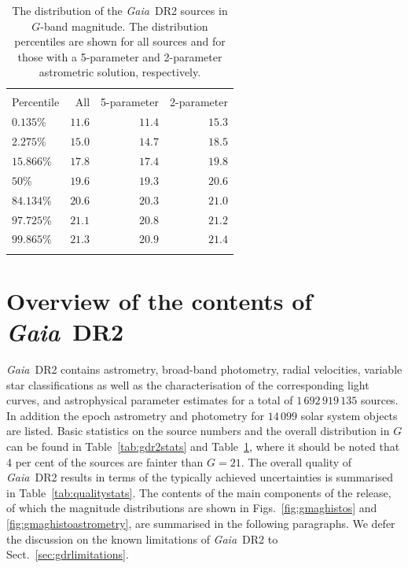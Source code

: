 \documentclass[longauth]{aa_gaia} %
\newcommand\gaia{\textit{Gaia}}
\newcommand\gdr[1]{\gaia~DR#1}
\newcommand\secref[1]{Sect.~\ref{#1}}
\newcommand\figsref[1]{Figs.~\ref{#1}}
\newcommand\tabref[1]{Table~\ref{#1}}
\newcommand\gdrtwototnum{\ensuremath{1\,692\,919\,135}}
\newcommand\gdrtwossonum{\ensuremath{14\,099}}
\begin{document}
\begin{table}[t]
  \caption{The distribution of the \gdr{2} sources in $G$-band magnitude. The distribution
percentiles are shown for all sources and for those with a 5-parameter and 2-parameter astrometric
solution, respectively.}
  \label{tab:gdr2magperc}
  \centering
  \begin{tabular}{lrrr}
    \hline\hline
    \noalign{\smallskip}
    \multicolumn{4}{c}{Magnitude distribution percentiles ($G$)} \\
    Percentile & All & 5-parameter & 2-parameter \\
    \noalign{\smallskip}
    \hline
    \noalign{\smallskip}
    $0.135$\% & $11.6$ & $11.4$ & $15.3$ \\
    $2.275$\% & $15.0$ & $14.7$ & $18.5$ \\
    $15.866$\% & $17.8$ & $17.4$ & $19.8$ \\
    $50$\% & $19.6$ & $19.3$ & $20.6$ \\
    $84.134$\% & $20.6$ & $20.3$ & $21.0$ \\
    $97.725$\% & $21.1$ & $20.8$ & $21.2$ \\
    $99.865$\% & $21.3$ & $20.9$ & $21.4$ \\[3pt]
    \noalign{\smallskip}
    \hline
  \end{tabular}
\end{table}

%
%

\section{Overview of the contents of \gdr{2}}
\label{sec:gdrtwosummary}

\gdr{2} contains astrometry, broad-band photometry, radial velocities, variable star
classifications as well as the characterisation of the corresponding light curves, and astrophysical
parameter estimates for a total of {\gdrtwototnum} sources. In addition the epoch astrometry and
photometry for {\gdrtwossonum} solar system objects are listed. Basic statistics on the source
numbers and the overall distribution in $G$ can be found in \tabref{tab:gdr2stats} and
\tabref{tab:gdr2magperc}, where it should be noted that 4 per cent of the sources are fainter than
$G=21$. The overall quality of \gdr{2} results in terms of the typically
achieved uncertainties is summarised in \tabref{tab:qualitystats}. The contents of the main
components of the release, of which the magnitude distributions are shown in \figsref{fig:gmaghistos}
and \ref{fig:gmaghistoastrometry}, are summarised in the following paragraphs. We defer the
discussion on the known limitations of \gdr{2} to \secref{sec:gdrlimitations}.
\end{document}
